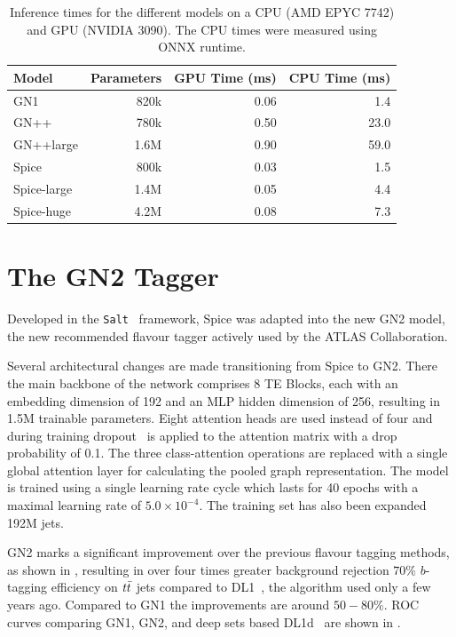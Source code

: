 \begin{table}[h!]
    \centering
    \begin{tabular}{lrrr}
        \toprule
        Model       & Parameters & GPU Time (ms) & CPU Time (ms) \\
        \midrule
        GN1         & 820k       & 0.06          & 1.4           \\
        GN++        & 780k       & 0.50          & 23.0          \\
        GN++large   & 1.6M       & 0.90          & 59.0          \\
        Spice       & 800k       & 0.03          & 1.5           \\
        Spice-large & 1.4M       & 0.05          & 4.4           \\
        Spice-huge  & 4.2M       & 0.08          & 7.3           \\
        \bottomrule
    \end{tabular}
    \caption{Inference times for the different models on a CPU (AMD EPYC 7742) and GPU (NVIDIA 3090). The CPU times were measured using ONNX runtime.}
    \label{tab:inference}
\end{table}

\FloatBarrier

\section{The GN2 Tagger}

Developed in the \texttt{Salt}~\cite{Salt} framework, Spice was adapted into the new GN2 model, the new recommended flavour tagger actively used by the ATLAS Collaboration.

Several architectural changes are made transitioning from Spice to GN2.
There the main backbone of the network comprises 8 TE Blocks, each with an embedding dimension of 192 and an MLP hidden dimension of 256, resulting in 1.5M trainable parameters.
Eight attention heads are used instead of four and during training dropout~\cite{Dropout} is applied to the attention matrix with a drop probability of 0.1.
The three class-attention operations are replaced with a single global attention layer for calculating the pooled graph representation.
The model is trained using a single learning rate cycle which lasts for 40 epochs with a maximal learning rate of $5.0 \times 10^{-4}$.
The training set has also been expanded 192M jets.

GN2 marks a significant improvement over the previous flavour tagging methods, as shown in , resulting in over four times greater background rejection $70\%$ $b$-tagging efficiency on $t\bar{t}$ jets compared to DL1~\cite{DL1}, the algorithm used only a few years ago.
Compared to GN1 the improvements are around $50-80\%$.
ROC curves comparing GN1, GN2, and deep sets based DL1d~\cite{DL1D}  are shown in .

